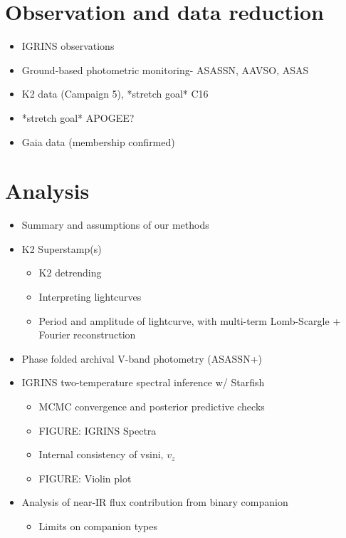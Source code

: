 \documentclass[twocolumn]{emulateapj}%
\begin{document}
\section{Observation and data reduction}
\begin{itemize}
\item IGRINS observations
\item Ground-based photometric monitoring- ASASSN, AAVSO, ASAS
\item K2 data (Campaign 5), *stretch goal* C16
\item *stretch goal* APOGEE?
\item Gaia data (membership confirmed)
\end{itemize}

\section{Analysis}
\begin{itemize}
\item Summary and assumptions of our methods
\item K2 Superstamp(s)
\begin{itemize}
  \item K2 detrending
  \item Interpreting lightcurves
  \item Period and amplitude of lightcurve, with multi-term Lomb-Scargle + Fourier reconstruction
\end{itemize}
\item Phase folded archival V-band photometry (ASASSN+)
\item IGRINS two-temperature spectral inference w/ Starfish
\begin{itemize}
  \item MCMC convergence and posterior predictive checks
  \item FIGURE: IGRINS Spectra
  \item Internal consistency of vsini, $v_z$
  \item FIGURE: Violin plot
\end{itemize}
\item Analysis of near-IR flux contribution from binary companion
\begin{itemize}
  \item Limits on companion types
\end{itemize}
\end{itemize}
\end{document}
